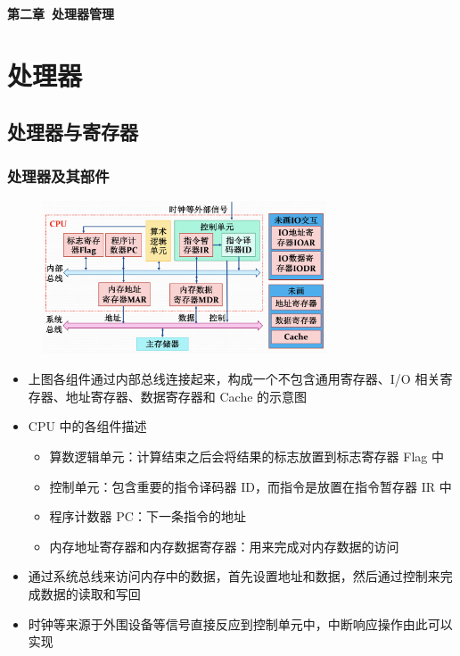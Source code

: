 \documentclass[cs4size,a4paper,10pt]{ctexart}
\begin{document}
	\begin{center}
		{\huge\textbf{第二章\ 处理器管理}}
	\end{center}
	\tableofcontents
	\clearpage

	\setcounter{page}{1}
	\setlength{\parskip}{0.65em}
	

	\section{处理器}
	\subsection{处理器与寄存器}
	\subsubsection{处理器及其部件}
	\begin{figure}[H]
		\centering
		\includegraphics[width=0.75\textwidth]{img/2.1.1.1}
	\end{figure}
	\begin{itemize}
		\item 上图各组件通过内部总线连接起来，构成一个不包含通用寄存器、I/O 相关寄存器、地址寄存器、数据寄存器和 Cache 的示意图
		\item CPU 中的各组件描述
		\begin{itemize}
			\item 算数逻辑单元：计算结束之后会将结果的标志放置到标志寄存器 Flag 中
			\item 控制单元：包含重要的指令译码器 ID，而指令是放置在指令暂存器 IR 中
			\item 程序计数器 PC：下一条指令的地址
			\item 内存地址寄存器和内存数据寄存器：用来完成对内存数据的访问
		\end{itemize}
		\item 通过系统总线来访问内存中的数据，首先设置地址和数据，然后通过控制来完成数据的读取和写回
		\item 时钟等来源于外围设备等信号直接反应到控制单元中，中断响应操作由此可以实现
	\end{itemize}
\end{document}
